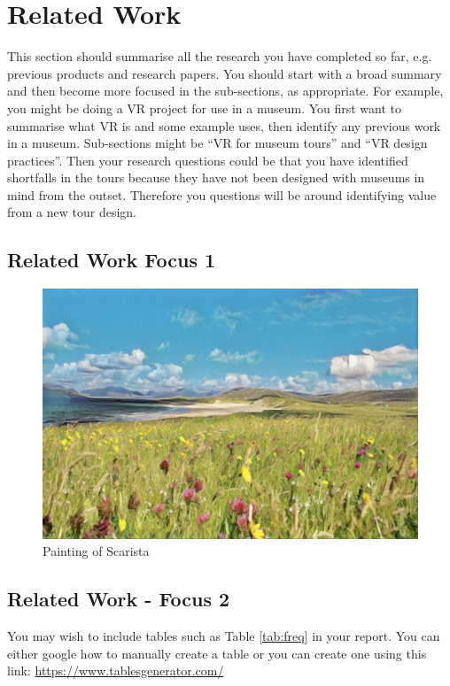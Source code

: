 \section{Related Work}
This section should summarise all the research you have completed so far, e.g. previous products and research papers. You should start with a broad summary and then become more focused in the sub-sections, as appropriate. For example, you might be doing a VR project for use in a museum. You first want to summarise what VR is and some example uses, then identify any previous work in a museum. Sub-sections might be ``VR for museum tours'' and ``VR design practices''. Then your research questions could be that you have identified shortfalls in the tours because they have not been designed with museums in mind from the outset. Therefore you questions will be around identifying value from a new tour design. 

\subsection{Related Work Focus 1}

\begin{figure}
\centering
\includegraphics[width=1\columnwidth]{author-files/figures/scarista.jpg}
\caption{Painting of Scarista}
\label{fig:scarista}
\end{figure}

\lipsum[20]

\subsection{Related Work - Focus 2}

You may wish to include tables such as Table \ref{tab:freq} in your report. You can either google how to manually create a table or you can create one using this link: \url{https://www.tablesgenerator.com/}


